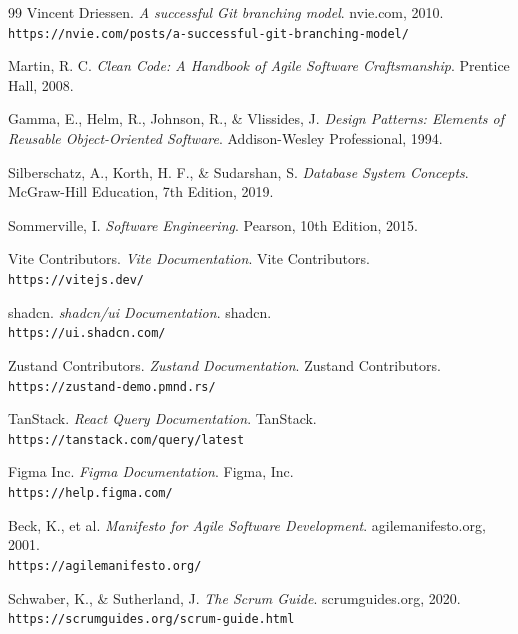 \begin{thebibliography}{99}
Vincent Driessen. \textit{A successful Git branching model}. nvie.com, 2010. \\
\texttt{https://nvie.com/posts/a-successful-git-branching-model/}

Martin, R. C. \textit{Clean Code: A Handbook of Agile Software Craftsmanship}. Prentice Hall, 2008.

Gamma, E., Helm, R., Johnson, R., \& Vlissides, J. \textit{Design Patterns: Elements of Reusable Object-Oriented Software}. Addison-Wesley Professional, 1994.

Silberschatz, A., Korth, H. F., \& Sudarshan, S. \textit{Database System Concepts}. McGraw-Hill Education, 7th Edition, 2019.

Sommerville, I. \textit{Software Engineering}. Pearson, 10th Edition, 2015.

Vite Contributors. \textit{Vite Documentation}. Vite Contributors. \\
\texttt{https://vitejs.dev/}

shadcn. \textit{shadcn/ui Documentation}. shadcn. \\
\texttt{https://ui.shadcn.com/}

Zustand Contributors. \textit{Zustand Documentation}. Zustand Contributors. \\
\texttt{https://zustand-demo.pmnd.rs/}

TanStack. \textit{React Query Documentation}. TanStack. \\
\texttt{https://tanstack.com/query/latest}

Figma Inc. \textit{Figma Documentation}. Figma, Inc. \\
\texttt{https://help.figma.com/}

Beck, K., et al. \textit{Manifesto for Agile Software Development}. agilemanifesto.org, 2001. \\
\texttt{https://agilemanifesto.org/}

Schwaber, K., \& Sutherland, J. \textit{The Scrum Guide}. scrumguides.org, 2020. \\
\texttt{https://scrumguides.org/scrum-guide.html}

\end{thebibliography}

